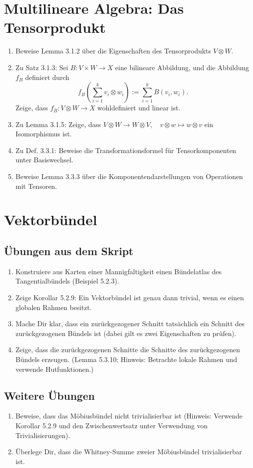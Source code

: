 \documentclass[a4paper,headsepline,headheight=30pt,numbers=enddot]{scrartcl}
\begin{document}
	\section[Das Tensorprodukt]{Multilineare Algebra: Das Tensorprodukt}
	\begin{enumerate}
		\item Beweise Lemma 3.1.2 über die Eigenschaften des Tensorprodukts $V\otimes W$.
		\item Zu Satz 3.1.3: Sei $B\colon V\times W \to X$ eine bilineare Abbildung, und die Abbildung $f_B$ definiert durch 
			\[f_B\left(\sum_{i=1}^k v_i \otimes w_i\right) := \sum_{i=1}^k B(v_i,w_i).\]
			Zeige, dass $f_B\colon V\otimes W\rightarrow X$ wohldefiniert und linear ist.
		\item Zu Lemma 3.1.5: Zeige, dass $V\otimes W\rightarrow W\otimes V,\quad v\otimes w \mapsto w\otimes v$ ein Isomorphismus ist.
		\item Zu Def. 3.3.1: Beweise die Transformationsformel für Tensorkomponenten unter Basiswechsel.
		\item Beweise Lemma 3.3.3 über die Komponentendarstellungen von Operationen mit Tensoren.
	\end{enumerate}


	\newpage
	\section{Vektorbündel}
	\subsection*{Übungen aus dem Skript}
	\begin{enumerate}
		\item Konstruiere aus Karten einer Mannigfaltigkeit einen Bündelatlas des Tangentialbündels (Beispiel 5.2.3). 
		\item Zeige Korollar 5.2.9: Ein Vektorbündel ist genau dann trivial, wenn es einen globalen Rahmen besitzt.
		\item Mache Dir klar, dass ein zurückgezogener Schnitt tatsächlich ein Schnitt des zurückgezogenen Bündels ist (dabei gilt es zwei Eigenschaften zu prüfen).
		\item Zeige, dass die zurückgezogenen Schnitte die Schnitte des zurückgezogenen Bündels erzeugen. (Lemma 5.3.10; Hinweis: Betrachte lokale Rahmen und verwende Hutfunktionen.)
	\end{enumerate}
	\subsection*{Weitere Übungen}
	\begin{enumerate}
		\item Beweise, dass das Möbiusbündel nicht trivialisierbar ist (Hinweis: Verwende Korollar 5.2.9 und den Zwischenwertsatz unter Verwendung von Trivialisierungen).
		\item Überlege Dir, dass die Whitney-Summe zweier Möbiusbündel trivialisierbar ist.
	\end{enumerate}
	\newpage
\end{document}
